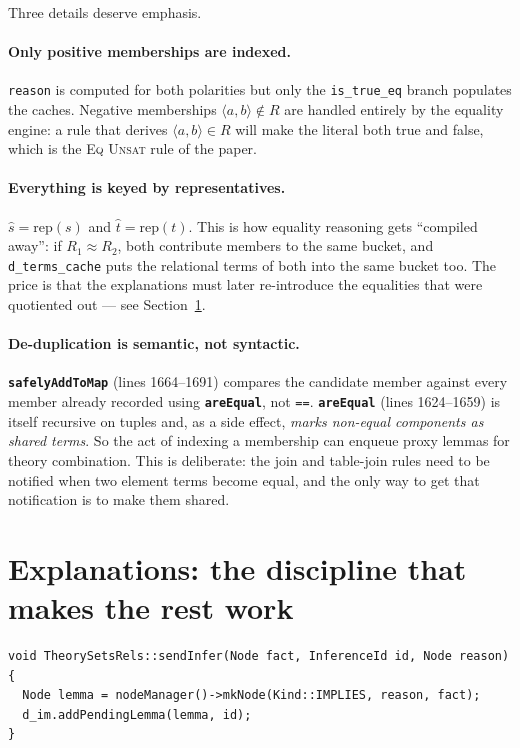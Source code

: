 \documentclass[11pt,a4paper]{article}
\newcommand{\code}[1]{\texttt{\small #1}}
\newcommand{\fn}[1]{\texttt{\small\bfseries #1}}
\newcommand{\tup}[1]{\langle #1 \rangle}
\newcommand{\rep}[1]{\mathrm{rep}(#1)}
\theoremstyle{definition}
\begin{document}
\noindent
Three details deserve emphasis.

\paragraph{Only positive memberships are indexed.}
\code{reason} is computed for both polarities but only the \code{is\_true\_eq}
branch populates the caches. Negative memberships
$\tup{a,b}\notin R$ are handled entirely by the equality engine: a rule that
derives $\tup{a,b}\in R$ will make the literal both true and false, which is
the \textsc{Eq Unsat} rule of the paper.

\paragraph{Everything is keyed by representatives.}
$\hat s = \rep{s}$ and $\hat t = \rep{t}$. This is how equality reasoning gets
``compiled away'': if $R_1 \approx R_2$, both contribute members to the same
bucket, and \code{d\_terms\_cache} puts the relational terms of both into the
same bucket too. The price is that the explanations must later re-introduce the
equalities that were quotiented out --- see Section~\ref{sec:exps}.

\paragraph{De-duplication is semantic, not syntactic.}
\fn{safelyAddToMap} (lines 1664--1691) compares the candidate member against
every member already recorded using \fn{areEqual}, not \code{==}. \fn{areEqual}
(lines 1624--1659) is itself recursive on tuples and, as a side effect,
\emph{marks non-equal components as shared terms}. So the act of indexing a
membership can enqueue proxy lemmas for theory combination. This is deliberate:
the join and table-join rules need to be notified when two element terms become
equal, and the only way to get that notification is to make them shared.

\section{Explanations: the discipline that makes the rest work}
\label{sec:exps}

\begin{lstlisting}
void TheorySetsRels::sendInfer(Node fact, InferenceId id, Node reason) {
  Node lemma = nodeManager()->mkNode(Kind::IMPLIES, reason, fact);
  d_im.addPendingLemma(lemma, id);
}
\end{lstlisting}
\end{document}
